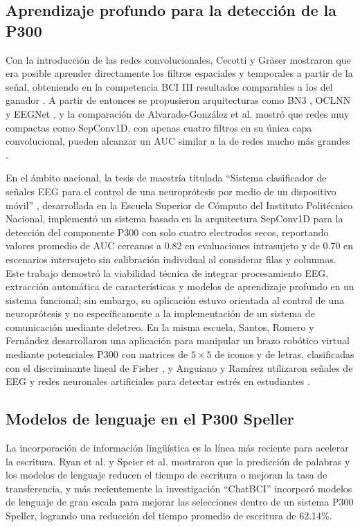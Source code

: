\subsection{Aprendizaje profundo para la detección de la P300}

Con la introducción de las redes convolucionales, Cecotti y Gräser mostraron que era posible
aprender directamente los filtros espaciales y temporales a partir de la señal, obteniendo en la
competencia BCI III resultados comparables a los del ganador \cite{cecotti2011}. A partir de
entonces se propusieron arquitecturas como BN3 \cite{liu2018}, OCLNN \cite{shan2018} y EEGNet
\cite{lawhern2018}, y la comparación de Alvarado-González et al. mostró que redes muy compactas
como SepConv1D, con apenas cuatro filtros en su única capa convolucional, pueden alcanzar un AUC
similar a la de redes mucho más grandes \cite{alvarado2021}.

En el ámbito nacional, la tesis de maestría titulada ``Sistema clasificador de señales EEG para
el control de una neuroprótesis por medio de un dispositivo móvil'' \cite{contreras2021},
desarrollada en la Escuela Superior de Cómputo del Instituto Politécnico Nacional, implementó un
sistema basado en la arquitectura SepConv1D para la detección del componente P300 con solo cuatro
electrodos secos, reportando valores promedio de AUC cercanos a 0.82 en evaluaciones intrasujeto y
de 0.70 en escenarios intersujeto sin calibración individual al considerar filas y columnas. Este
trabajo demostró la viabilidad técnica de integrar procesamiento EEG, extracción automática de
características y modelos de aprendizaje profundo en un sistema funcional; sin embargo, su
aplicación estuvo orientada al control de una neuroprótesis y no específicamente a la
implementación de un sistema de comunicación mediante deletreo. En la misma escuela, Santos,
Romero y Fernández desarrollaron una aplicación para manipular un brazo robótico virtual mediante
potenciales P300 con matrices de $5\times5$ de iconos y de letras, clasificadas con el
discriminante lineal de Fisher \cite{santos2017}, y Anguiano y Ramírez utilizaron señales de EEG
y redes neuronales artificiales para detectar estrés en estudiantes \cite{anguiano2019}.

\subsection{Modelos de lenguaje en el P300 Speller}

La incorporación de información lingüística es la línea más reciente para acelerar la escritura.
Ryan et al. \cite{ryan2011} y Speier et al. \cite{speier2012} mostraron que la predicción de
palabras y los modelos de lenguaje reducen el tiempo de escritura o mejoran la tasa de
transferencia, y más recientemente la investigación ``ChatBCI'' \cite{hong2026} incorporó modelos
de lenguaje de gran escala para mejorar las selecciones dentro de un sistema P300 Speller, logrando
una reducción del tiempo promedio de escritura de 62.14\%.

